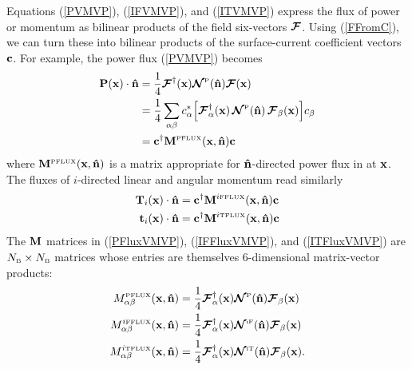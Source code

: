 \documentclass[letterpaper]{article}
\newcommand{\IFFlux}{^{i\text{\tiny FFLUX}}}
\newcommand{\ITFlux}{^{i\text{\tiny TFLUX}}}
\begin{document}
Equations (\ref{PVMVP}), (\ref{IFVMVP}), and (\ref{ITVMVP}) express
the flux of power or momentum as bilinear products of the field
six-vectors $\boldsymbol{\mathcal{F}}$. Using (\ref{FFromC}), we can turn these into
bilinear products of the surface-current coefficient vectors
$\mathbf{c}$. For example, the power flux (\ref{PVMVP}) becomes 
\begin{align}
 \mathbf{P}(\mathbf{x}) \cdot \mathbf{\hat n}
&=\frac{1}{4}\boldsymbol{\mathcal{F}}^\dagger(\mathbf{x}) \boldsymbol{\mathcal{N}}^{\hbox{\tiny{P}}}(\mathbf{\hat n}) \boldsymbol{\mathcal{F}}(\mathbf{x})
\nonumber \\
&=\frac{1}{4}\sum_{\alpha \beta} 
  c_\alpha^* 
  \Big[ \boldsymbol{\mathcal{F}}^\dagger_\alpha(\mathbf{x})
        \,
        \boldsymbol{\mathcal{N}}^{\hbox{\tiny{P}}}(\mathbf{\hat n})
        \,
        \boldsymbol{\mathcal{F}}_\beta(\mathbf{x})
  \Big]
  c_\beta 
\nonumber \\
&= \mathbf{c}^\dagger \mathbf{M}^{\hbox{\tiny{PFLUX}}}(\mathbf{x}, \mathbf{\hat n}) \mathbf{c} 
\label{PFluxVMVP}
\end{align}
where $\mathbf{M}^{\hbox{\tiny{PFLUX}}}(\mathbf{x},\mathbf{\hat n})$ is a matrix 
appropriate for $\mathbf{\hat n}$-directed power flux in at $\mathbf{x}$.
The fluxes of $i$-directed linear and angular momentum read
similarly
\begin{align}
\vb T_i(\vb x) \cdot \vbhat{n}
&= \vb c^\dagger \vb M\IFFlux(\vb x, \vbhat{n}) \vb c 
\label{IFFluxVMVP}
\\
\vb t_i(\vb x) \cdot \vbhat{n}
&= \vb c^\dagger \vb M\ITFlux(\vb x, \vbhat{n}) \vb c 
\label{ITFluxVMVP}
\end{align}
The $\mathbf{M}$ matrices in (\ref{PFluxVMVP}), (\ref{IFFluxVMVP}), and 
(\ref{ITFluxVMVP}) are $N_{\hbox{\tiny{B}}}\times N_{\hbox{\tiny{B}}}$ matrices
whose entries are themselves 6-dimensional matrix-vector products:
\begin{align*}
M_{\alpha\beta}\supt{PFLUX}(\vb x, \vbhat{n}) 
 &= \frac{1}{4} 
    \bmc F^\dagger_\alpha(\vb x) 
    \bmc N\supt{P}(\vbhat{n})
    \bmc F_\beta(\vb x) 
\\
M_{\alpha\beta}\IFFlux(\vb x, \vbhat{n})
 &= \frac{1}{4} 
    \bmc F^\dagger_\alpha(\vb x) 
    \bmc N\supt{iF}(\vbhat{n})
    \bmc F_\beta(\vb x) 
\\
M_{\alpha\beta}\ITFlux(\vb x, \vbhat{n})
 &= \frac{1}{4} 
    \bmc F^\dagger_\alpha(\vb x) 
    \bmc N\supt{iT}(\vbhat{n})
    \bmc F_\beta(\vb x).
\end{align*}

\end{document}

